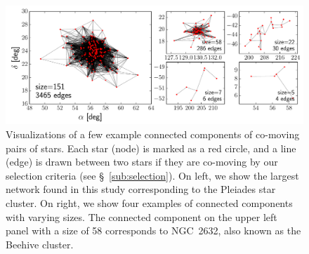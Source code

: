 \documentclass[manuscript, letterpaper]{aastex6}
\begin{document}
\begin{figure}[htbp]
  \begin{center}
    \includegraphics[width=\textwidth]{figures/graphviz_examples.pdf}
  \end{center}
  \caption{%
    Visualizations of a few example connected components of co-moving pairs of stars.
    Each star (node) is marked as a red circle, and a line (edge) is drawn
    between two stars if they are co-moving by our selection criteria
    (see \S~\ref{sub:selection}). On left, we show the largest network
    found in this study corresponding to the Pleiades star cluster.
    On right, we show four examples of connected components with varying sizes.
    The connected component on the upper left panel with a size of 58 corresponds
    to NGC~2632, also known as the Beehive cluster.
    \label{fig:graphviz_examples}}
\end{figure}
\end{document}
